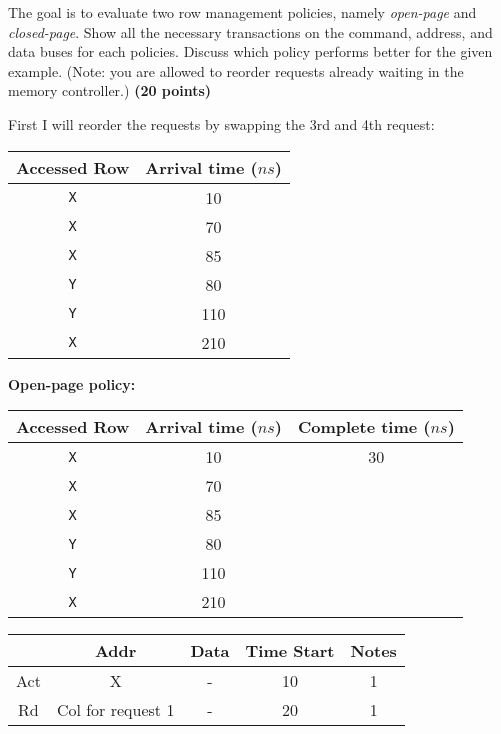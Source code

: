 \documentclass[a4paper, 11pt]{exam}
\begin{document}
\begin{enumerate}
The goal is to evaluate two row management policies, namely \textit{open-page} and \textit{closed-page}.
Show all the necessary transactions on the command, address, and data buses for each policies.
Discuss which policy performs better for the given example.
(Note: you are allowed to reorder requests already waiting in the memory controller.)
\textbf{(20 points)}
\begin{figure}[h!]
	\begin{center}
	\end{center}
\end{figure}

First I will reorder the requests by swapping the 3rd and 4th request:

\begin{center}
	\begin{tabular}{|c|c|}
		\hline
		\textbf{Accessed Row} & \textbf{Arrival time ($ns$)} \\
		\hline
		\texttt{X}  & 10 \\
		\hline
		\texttt{X}  & 70 \\
		\hline
		\texttt{X}  & 85 \\
		\hline
		\texttt{Y}  & 80 \\
		\hline
		\texttt{Y}  & 110 \\
		\hline
		\texttt{X} & 210 \\
		\hline
	\end{tabular}
\end{center}

\textbf{Open-page policy:}

\begin{center}
	\begin{tabular}{|c|c|c|}
		\hline
		\textbf{Accessed Row} & \textbf{Arrival time ($ns$)} & \textbf{Complete time ($ns$)} \\
		\hline
		\texttt{X}  & 10 & 30\\
		\hline
		\texttt{X}  & 70 & \\
		\hline
		\texttt{X}  & 85 &\\
		\hline
		\texttt{Y}  & 80 &\\
		\hline
		\texttt{Y}  & 110 &\\
		\hline
		\texttt{X} & 210 &\\
		\hline
	\end{tabular}
\end{center}

\begin{center}
	\begin{tabular}{|c|c|c|c|c}}
		\hline
		\textbf{Cmd} & \textbf{Addr} & \textbf{Data} & \textbf{Time Start} & \textbf{Notes} \\
		\hline
		Act & X & - & 10 & 1\\ 
		\hline
		Rd & Col for request 1 & - & 20 &  1\\ 
		\hline
	\end{tabular}
\end{center}


\end{enumerate}
\end{document}
